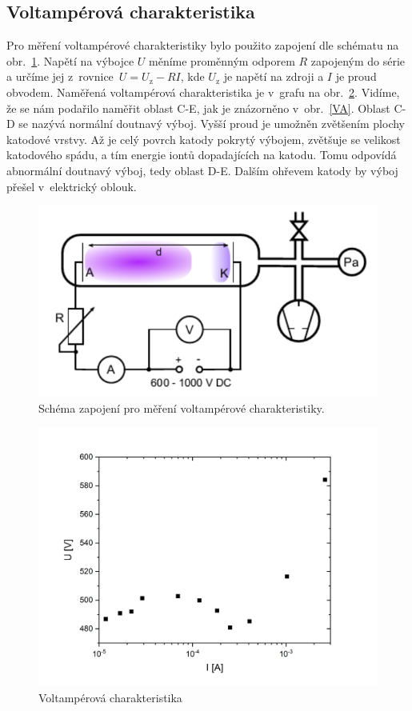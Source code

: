 \documentclass[a4paper,12pt]{article}
\begin{document}
\newpage
\subsection{Voltampérová charakteristika}
Pro měření voltampérové charakteristiky bylo použito zapojení dle schématu na 
obr.~\ref{schema3}. Napětí na výbojce $U$ měníme proměnným odporem $R$ 
zapojeným do série a určíme jej z~rovnice~$U = U_\text{z} - RI$, kde 
$U_\text{z}$ je napětí na zdroji a $I$ je proud obvodem.  
Naměřená voltampérová charakteristika je v~grafu na 
obr.~\ref{VAodpor}. Vidíme, 
že se nám podařilo naměřit oblast C-E, jak je znázorněno v~obr.~\ref{VA}. 
Oblast C-D se nazývá normální doutnavý výboj. Vyšší proud je umožněn zvětšením 
plochy katodové vrstvy. Až je celý povrch katody pokrytý výbojem, 
zvětšuje 
se velikost katodového spádu, a tím energie iontů dopadajících na katodu. Tomu 
odpovídá 
abnormální doutnavý výboj, tedy oblast D-E. Dalším ohřevem katody by výboj 
přešel v~elektrický oblouk.

\begin{figure}[h!]
	\centering
	\includegraphics[width=120mm]{schema3op2.png}
	\caption{Schéma zapojení pro měření voltampérové charakteristiky.}
	\label{schema3}
\end{figure}

\begin{figure}[h!]
	\centering
	\includegraphics[width=145mm]{graph1.png}
	\caption{Voltampérová charakteristika}
	\label{VAodpor}
\end{figure}
\end{document}
